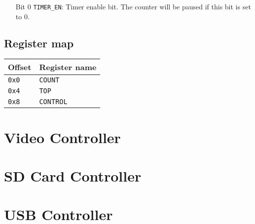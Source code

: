 \documentclass[11pt,openany]{report}
\begin{document}
\begin{enumerate}
  \item[Bit 0] \verb|TIMER_EN|: Timer enable bit. The counter will be paused if
    this bit is set to 0.
\end{enumerate}

\subsection{Register map}
\begin{center}
  \begin{tabular}{|l|l|}
    \hline
    \textbf{Offset} & \textbf{Register name} \\
    \hline
    \texttt{0x0} & \texttt{COUNT} \\
    \hline
    \texttt{0x4} & \texttt{TOP} \\
    \hline
    \texttt{0x8} & \texttt{CONTROL} \\
    \hline
  \end{tabular}
\end{center}

\section{Video Controller}

\section{SD Card Controller}

\section{USB Controller}
\end{document}
